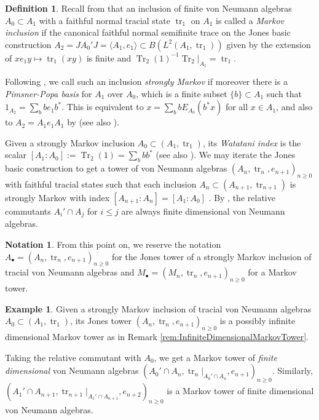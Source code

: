 \documentclass[11pt]{article}
\theoremstyle{plain}
\theoremstyle{definition}
\newtheorem{defn}[thm]{Definition}
\newtheorem{nota}[thm]{Notation}
\newtheorem{ex}[thm]{Example}
\DeclareMathOperator{\Tr}{Tr}
\DeclareMathOperator{\tr}{tr}
\begin{document}
\begin{defn}
\label{def:StronglyMarkovInclusion}
Recall from \cite{MR1278111} that an inclusion of finite von Neumann algebras $A_0\subset A_1$ with a faithful normal tracial state $\tr_1$ on $A_1$ is called a \emph{Markov inclusion} 
if
the canonical faithful normal semifinite trace on the Jones basic construction $A_2 = JA_0'J = \langle A_1, e_1\rangle \subset B(L^2(A_1, \tr_1))$ given by the extension of $xe_1y \mapsto \tr_1(xy)$ is finite and $\Tr_2(1)^{-1}\Tr_2|_{A_1}=\tr_1$.

Following \cite{MR2812459}, we call such an inclusion \emph{strongly Markov} if moreover there is a \emph{Pimsner-Popa basis} for $A_1$ over $A_0$, which is a finite subset $\{b\}\subset A_1$ such that $1_{A_2} = \sum_b b e_1b^*$.
This is equivalent to $x = \sum_b b E_{A_0}(b^*x)$ for all $x\in A_1$, and also to $A_2 = A_1e_1A_1$ by \cite[Prop.~3(b)]{MR561983}
(see also \cite{MR996807}).

Given a strongly Markov inclusion $A_0\subset (A_1, \tr_1)$, 
its \emph{Watatani index} \cite{MR996807} is the scalar $[A_1:A_0]:=\Tr_2(1) = \sum_b bb^* $ (see also \cite[1.1.4(c)]{MR1278111}).
We may iterate the Jones basic construction to get a tower of von Neumann algebras $(A_n ,\tr_n, e_{n+1})_{n\geq 0}$ with faithful tracial states such that each inclusion $A_{n}\subset (A_{n+1}, \tr_{n+1})$ is strongly Markov with index $[A_{n+1}: A_n] = [A_1:A_0]$ \cite{MR2812459}.
By \cite[Prop.~2.7.3]{MR996807}, the relative commutants $A_i' \cap A_j$ for $i\leq j$ are always finite dimensional von Neumann algebras.
\end{defn}

\begin{nota}
From this point on, we reserve the notation $A_\bullet=(A_n,\tr_n, e_{n+1})_{n\geq 0}$ for the Jones tower of a strongly Markov inclusion of tracial von Neumann algebras and $M_\bullet = (M_n, \tr_n, e_{n+1})_{n\geq 0}$ for a Markov tower.
\end{nota}

\begin{ex}
Given a strongly Markov inclusion of tracial von Neumann algebras $A_0\subset (A_1, \tr_1)$, its Jones tower $(A_n, \tr_n, e_{n+1})_{n\geq 0}$ is a possibly infinite dimensional Markov tower as in Remark \ref{rem:InfiniteDimensionalMarkovTower}.

Taking the relative commutant with $A_0$, we get a Markov tower of \emph{finite dimensional} von Neumann algebras $(A_0'\cap A_n , \tr_n|_{A_0'\cap A_n} , e_{n+1})_{n\geq 0}$.
Similarly, $(A_1'\cap A_{n+1} , \tr_{n+1}|_{A_1'\cap A_{n+1}} , e_{n+2})_{n\geq 0}$ is a Markov tower of finite dimensional von Neumann algebras.
\end{ex}
\end{document}
